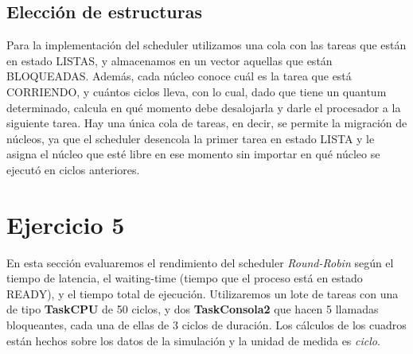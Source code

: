 \documentclass[11pt]{article}
\begin{document}
\subsection{Elección de estructuras}

Para la implementación del scheduler utilizamos una cola con las tareas que están en estado LISTAS, y almacenamos en un vector aquellas que están BLOQUEADAS. Además, cada núcleo conoce cuál es la tarea que está CORRIENDO, y cuántos ciclos lleva, con lo cual, dado que tiene un quantum determinado, calcula en qué momento debe desalojarla y darle el procesador a la siguiente tarea.
Hay una única cola de tareas, en decir, se permite la migración de núcleos, ya que el scheduler desencola la primer tarea en estado LISTA y le asigna el núcleo que esté libre en ese momento sin importar en qué núcleo se ejecutó en ciclos anteriores. 

\newpage

\section{Ejercicio 5}

En esta sección evaluaremos el rendimiento del scheduler \textit{Round-Robin} según el tiempo de latencia, el waiting-time (tiempo que el proceso está en estado READY), y el tiempo total de ejecución. Utilizaremos un lote de tareas con una de tipo \textbf{TaskCPU} de 50 ciclos, y dos \textbf{TaskConsola2} que hacen 5 llamadas bloqueantes, cada una de ellas de 3 ciclos de duración. 
Los cálculos de los cuadros están hechos sobre los datos de la simulación y la unidad de medida es \textit{ciclo}. \\

\end{document}
